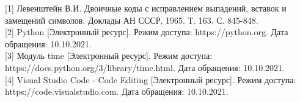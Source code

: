 \documentclass[12pt, a4paper]{report}
\begin{document}
[1] Левенштейн В.И. Двоичные коды с исправлением выпадений, вставок и замещений символов. Доклады АН СССР, 1965. Т. 163. С. 845-848. \\

[2] Python [Электронный ресурс]. Режим доступа: https://python.org. Дата обращения: 10.10.2021.\\

[3] Модуль time [Электронный ресурс]. Режим доступа: \newline https://docs.python.org/3/library/time.html. Дата обращения: 10.10.2021.\\

[4] Visual Studio Code - Code Editing [Электронный ресурс]. Режим доступа: https://code.visualstudio.com. Дата обращения: 10.10.2021.
\end{document}

